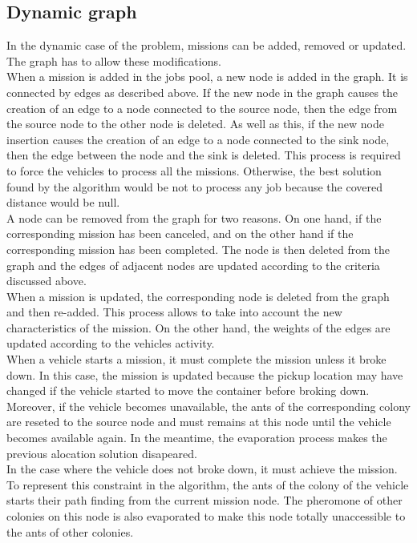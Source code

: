 \documentclass[a4paper,10pt]{article}
\begin{document}
\subsection{Dynamic graph}
In the dynamic case of the problem, missions can be added, removed or updated. The graph has to allow these modifications.\\

When a mission is added in the jobs pool, a new node is added in the graph. It is connected by edges as described above. If the new node in the graph causes the creation of an edge to a node connected to the source node, then the edge from the source node to the other node is deleted. As well as this, if the new node insertion causes the creation of an edge to a node connected to the sink node, then the edge between the node and the sink is deleted. This process is required to force the vehicles to process all the missions. Otherwise, the best solution found by the algorithm would be not to process any job because the covered distance would be null.
\\

A node can be removed from the graph for two reasons. On one hand, if the corresponding mission has been canceled, and on the other hand if the corresponding mission has been completed. The node is then deleted from the graph and the edges of adjacent nodes are updated according to the criteria discussed above.
\\

When a mission is updated, the corresponding node is deleted from the graph and then re-added. This process allows to take into account the new characteristics of the mission. On the other hand, the weights of the edges are updated according to the vehicles activity.
\\

When a vehicle starts a mission, it must complete the mission unless it broke down. In this case, the mission is updated because the pickup location may have changed if the vehicle started to move the container before broking down. Moreover, if the vehicle becomes unavailable, the ants of the corresponding colony are reseted to the source node and must remains at this node until the vehicle becomes available again. In the meantime, the evaporation process makes the previous alocation solution disapeared.\\

In the case where the vehicle does not broke down, it must achieve the mission. To represent this constraint in the algorithm, the ants of the colony of the vehicle starts their path finding from the current mission node. The pheromone of other colonies on this node is also evaporated to make this node totally unaccessible to the ants of other colonies.
\end{document}
